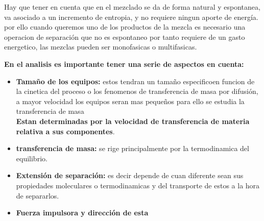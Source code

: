\documentclass{report}
\begin{document}
\vspace{1\baselineskip}
\begin{raggedright}
	Hay que tener en cuenta que en el mezclado se da de forma natural y espontanea, va asociado a un incremento de entropia, y no requiere ningun aporte de energía. por ello cuando queremos uno de los productos de la mezcla es necesario una operacion de separación que no es espontaneo por tanto requiere de un gasto energetico, las mezclas pueden ser monofasicas o multifasicas.\\
	\vspace{1\baselineskip}
	\begin{center}
		\textbf{En el analisis es importante tener una serie de aspectos en cuenta:}\\
		\vspace{1\baselineskip}
	\end{center}
	\begin{itemize}
		\item \textbf{Tamaño de los equipos: } estos tendran un tamaño especificoen funcion  de la cinetica del proceso o los fenomenos de transferencia de masa por difusión, a mayor velocidad los equipos seran mas pequeños para ello se estudia la transferencia de masa\\
		\textbf{Estan determinadas por la velocidad de transferencia de materia relativa a sus componentes}.
		\item \textbf{transferencia de masa: } se rige principalmente por la termodinamica del equilibrio.
		\item \textbf{Extensión de separación: } es decir depende de cuan diferente sean sus propiedades moleculares o termodinamicas y del transporte de estos a la hora de separarlos.
		\item \textbf{Fuerza impulsora y dirección de esta}
	\end{itemize}

\end{raggedright}
\vspace{2\baselineskip}
\vspace{1\baselineskip}
\end{document}
